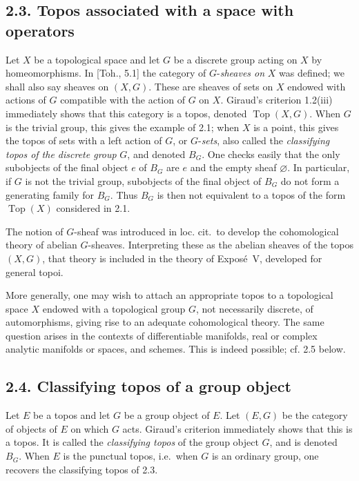 \documentclass[11pt]{article}
\newcommand{\Top}{\operatorname{Top}}
\newcommand{\ie}{i.e.}
\newcommand{\loccit}{loc. cit.}
\begin{document}
\subsection*{2.3. Topos associated with a space with operators}
Let \(X\) be a topological space and let \(G\) be a discrete group acting on \(X\) by homeomorphisms. In [Toh., 5.1] the category of \(G\)-\emph{sheaves on} \(X\) was defined; we shall also say sheaves on \((X,G)\). These are sheaves of sets on \(X\) endowed with actions of \(G\) compatible with the action of \(G\) on \(X\). Giraud's criterion 1.2(iii) immediately shows that this category is a topos, denoted \(\Top(X,G)\). When \(G\) is the trivial group, this gives the example of 2.1; when \(X\) is a point, this gives the topos of sets with a left action of \(G\), or \(G\)-\emph{sets}, also called the \emph{classifying topos of the discrete group} \(G\), and denoted \(B_G\). One checks easily that the only subobjects of the final object \(e\) of \(B_G\) are \(e\) and the empty sheaf \(\varnothing\). In particular, if \(G\) is not the trivial group, subobjects of the final object of \(B_G\) do not form a generating family for \(B_G\). Thus \(B_G\) is then not equivalent to a topos of the form \(\Top(X)\) considered in 2.1.

The notion of \(G\)-sheaf was introduced in \loccit\ to develop the cohomological theory of abelian \(G\)-sheaves. Interpreting these as the abelian sheaves of the topos \((X,G)\), that theory is included in the theory of Expos\'e~V, developed for general topoi.

More generally, one may wish to attach an appropriate topos to a topological space \(X\) endowed with a topological group \(G\), not necessarily discrete, of automorphisms, giving rise to an adequate cohomological theory. The same question arises in the contexts of differentiable manifolds, real or complex analytic manifolds or spaces, and schemes. This is indeed possible; cf. 2.5 below.

\subsection*{2.4. Classifying topos of a group object}
Let \(E\) be a topos and let \(G\) be a group object of \(E\). Let \((E,G)\) be the category of objects of \(E\) on which \(G\) acts. Giraud's criterion immediately shows that this is a topos. It is called the \emph{classifying topos} of the group object \(G\), and is denoted \(B_G\). When \(E\) is the punctual topos, \ie\ when \(G\) is an ordinary group, one recovers the classifying topos of 2.3.
\end{document}

